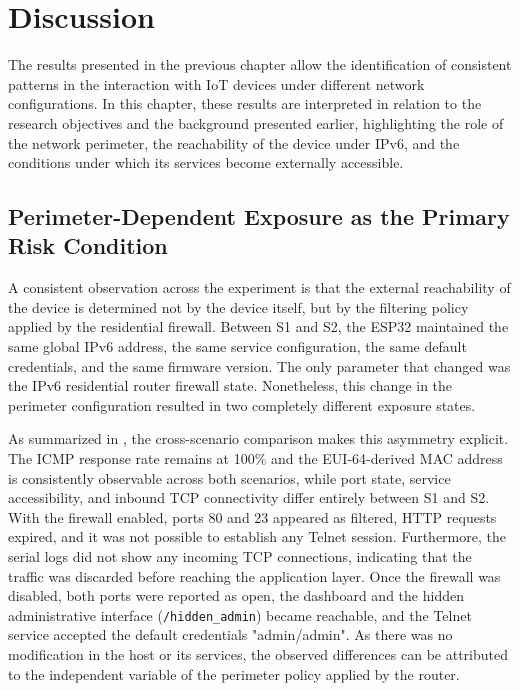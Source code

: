 \chapter{Discussion}\label{chap:discussion}
The results presented in the previous chapter allow the identification of consistent patterns in the interaction with IoT devices under different network configurations. In this chapter, these results are interpreted in relation to the research objectives and the background presented earlier, highlighting the role of the network perimeter, the reachability of the device under IPv6, and the conditions under which its services become externally accessible.

\section{Perimeter-Dependent Exposure as the Primary Risk Condition}\label{sec:discussion-perimeter-exposure}
A consistent observation across the experiment is that the external reachability of the device is determined not by the device itself, but by the filtering policy applied by the residential firewall. Between S1 and S2, the ESP32 maintained the same global IPv6 address, the same service configuration, the same default credentials, and the same firmware version. The only parameter that changed was the IPv6 residential router firewall state. Nonetheless, this change in the perimeter configuration resulted in two completely different exposure states.

As summarized in , the cross-scenario comparison makes this asymmetry explicit. The ICMP response rate remains at 100\% and the EUI-64-derived MAC address is consistently observable across both scenarios, while port state, service accessibility, and inbound TCP connectivity differ entirely between S1 and S2. With the firewall enabled, ports 80 and 23 appeared as filtered, HTTP requests expired, and it was not possible to establish any Telnet session. Furthermore, the serial logs did not show any incoming TCP connections, indicating that the traffic was discarded before reaching the application layer. Once the firewall was disabled, both ports were reported as open, the dashboard and the hidden administrative interface (\texttt{/hidden\_admin}) became reachable, and the Telnet service accepted the default credentials "admin/admin". As there was no modification in the host or its services, the observed differences can be attributed to the independent variable of the perimeter policy applied by the router.

